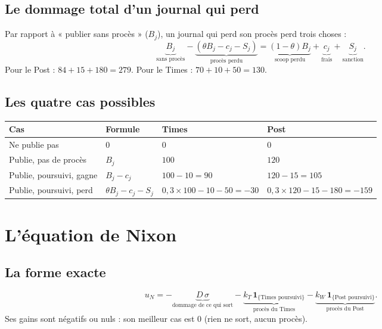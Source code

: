 \documentclass[11pt,a4paper]{article}
\theoremstyle{definition}
\newcommand{\ind}[1]{\mathbf{1}_{\{\text{#1}\}}}
\newcommand{\T}[1]{\textcolor{nyt}{#1}}
\newcommand{\W}[1]{\textcolor{wp}{#1}}
\begin{document}
\subsection{Le dommage total d'un journal qui perd}
Par rapport à « publier sans procès » ($B_j$), un journal qui perd son procès perd trois choses :
\[
\underbrace{B_j}_{\text{sans procès}}-\underbrace{(\theta B_j-c_j-S_j)}_{\text{procès perdu}}
=\underbrace{(1-\theta)B_j}_{\text{scoop perdu}}+\underbrace{c_j}_{\text{frais}}+\underbrace{S_j}_{\text{sanction}} .
\]
Pour le Post : $84+15+180=279$. Pour le Times : $70+10+50=130$.

\subsection{Les quatre cas possibles}
\begin{center}
\small
\begin{tabular}{@{}llll@{}}
\toprule
Cas & Formule & \T{Times} & \W{Post} \\
\midrule
Ne publie pas & $0$ & $0$ & $0$ \\
Publie, pas de procès & $B_j$ & $100$ & $120$ \\
Publie, poursuivi, gagne & $B_j-c_j$ & $100-10=90$ & $120-15=105$ \\
Publie, poursuivi, perd & $\theta B_j-c_j-S_j$ & $0,3\times100-10-50=-30$ & $0,3\times120-15-180=-159$ \\
\bottomrule
\end{tabular}
\end{center}

\section{L'équation de Nixon}

\subsection{La forme exacte}
\begin{equation}
u_N=-\underbrace{D\,\sigma}_{\text{dommage de ce qui sort}}-\underbrace{k_T\,\ind{Times poursuivi}}_{\text{procès du Times}}-\underbrace{k_W\,\ind{Post poursuivi}}_{\text{procès du Post}} . \label{eq:uN}
\end{equation}
Ses gains sont négatifs ou nuls : son meilleur cas est $0$ (rien ne sort, aucun procès).
\end{document}
